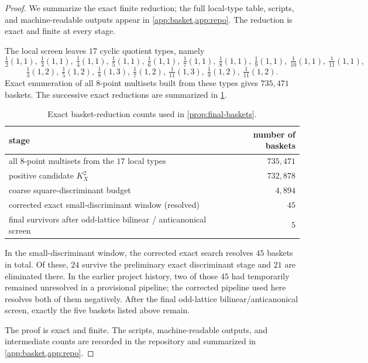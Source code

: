 \documentclass[11pt]{article}
\theoremstyle{definition}
\begin{document}
\begin{proof}
We summarize the exact finite reduction; the full local-type table, scripts, and machine-readable outputs appear in \cref{app:basket,app:repo}. The reduction is exact and finite at every stage.

The local screen leaves $17$ cyclic quotient types, namely
\[
\tfrac12(1,1),\ \tfrac13(1,1),\ \tfrac14(1,1),\ \tfrac15(1,1),\ \tfrac16(1,1),\ \tfrac17(1,1),\ \tfrac18(1,1),\ \tfrac19(1,1),\ \tfrac1{10}(1,1),\ \tfrac1{11}(1,1),
\]
\[
\tfrac13(1,2),\ \tfrac15(1,2),\ \tfrac18(1,3),\ \tfrac17(1,2),\ \tfrac1{11}(1,3),\ \tfrac19(1,2),\ \tfrac1{11}(1,2).
\]
Exact enumeration of all $8$-point multisets built from these types gives $735{,}471$ baskets. The successive exact reductions are summarized in \cref{tab:basketcounts}.

\begin{table}[h]
\centering
\begin{tabular}{l r}
\toprule
stage & number of baskets \\
\midrule
all $8$-point multisets from the $17$ local types & $735{,}471$ \\
positive candidate $K_X^2$ & $732{,}878$ \\
coarse square-discriminant budget & $4{,}894$ \\
corrected exact small-discriminant window (resolved) & $45$ \\
final survivors after odd-lattice bilinear / anticanonical screen & $5$ \\
\bottomrule
\end{tabular}
\caption{Exact basket-reduction counts used in \cref{prop:final-baskets}.}
\label{tab:basketcounts}
\end{table}

In the small-discriminant window, the corrected exact search resolves $45$ baskets in total. Of these, $24$ survive the preliminary exact discriminant stage and $21$ are eliminated there. In the earlier project history, two of those $45$ had temporarily remained unresolved in a provisional pipeline; the corrected pipeline used here resolves both of them negatively. After the final odd-lattice bilinear/anticanonical screen, exactly the five baskets listed above remain.

The proof is exact and finite. The scripts, machine-readable outputs, and intermediate counts are recorded in the repository and summarized in \cref{app:basket,app:repo}.
\end{proof}
\end{document}

